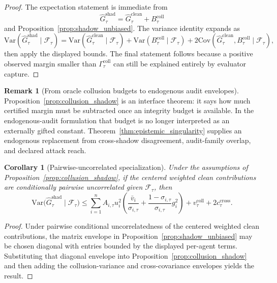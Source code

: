 \documentclass[11pt]{article}
\newtheorem{corollary}[theorem]{Corollary}
\theoremstyle{definition}
\newtheorem{remark}[theorem]{Remark}
\newcommand{\Var}{\mathrm{Var}}
\newcommand{\Cov}{\mathrm{Cov}}
\newcommand{\1}{\mathbf{1}}
\begin{document}
\begin{proof}
The expectation statement is immediate from
\[
\widehat G_\tau^{\mathrm{shad}}=\widehat G_\tau^{\mathrm{clean}}+B_\tau^{\mathrm{coll}}
\]
and Proposition~\ref{prop:shadow_unbiased}. The variance identity expands as
\[
\Var(\widehat G_\tau^{\mathrm{shad}}\mid \mathcal F_\tau)
=
\Var(\widehat G_\tau^{\mathrm{clean}}\mid \mathcal F_\tau)+\Var(B_\tau^{\mathrm{coll}}\mid \mathcal F_\tau)+2\Cov(\widehat G_\tau^{\mathrm{clean}},B_\tau^{\mathrm{coll}}\mid \mathcal F_\tau),
\]
then apply the displayed bounds. The final statement follows because a positive observed margin smaller than $\Gamma_\tau^{\mathrm{coll}}$ can still be explained entirely by evaluator capture.
\end{proof}

\begin{remark}[From oracle collusion budgets to endogenous audit envelopes]
Proposition~\ref{prop:collusion_shadow} is an interface theorem: it says how much certified margin must be subtracted once an integrity budget is available. In the endogenous-audit formulation that budget is no longer interpreted as an externally gifted constant. Theorem~\ref{thm:epistemic_singularity} supplies an endogenous replacement from cross-shadow disagreement, audit-family overlap, and declared attack reach.
\end{remark}

\begin{corollary}[Pairwise-uncorrelated specialization]\label{cor:shadow_var_pairwise}
Under the assumptions of Proposition~\ref{prop:collusion_shadow}, if the centered weighted clean contributions are conditionally pairwise uncorrelated given $\mathcal F_\tau$, then
\[
\Var\bigl(\widehat G_\tau^{\mathrm{shad}}\mid \mathcal F_\tau\bigr)
\le
\sum_{i=1}^n A_{i,\tau}u_i^2\left(\frac{\bar v_i}{\sigma_{i,\tau}}+\frac{1-\sigma_{i,\tau}}{\sigma_{i,\tau}}g_i^2\right)+v_\tau^{\mathrm{coll}}+2c_\tau^{\mathrm{cross}}.
\]
\end{corollary}

\begin{proof}
Under pairwise conditional uncorrelatedness of the centered weighted clean contributions, the matrix envelope in Proposition~\ref{prop:shadow_unbiased} may be chosen diagonal with entries bounded by the displayed per-agent terms. Substituting that diagonal envelope into Proposition~\ref{prop:collusion_shadow} and then adding the collusion-variance and cross-covariance envelopes yields the result.
\end{proof}
\end{document}
